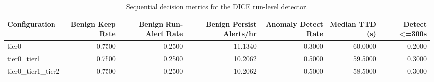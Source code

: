 \begin{table}[t]
\centering
\caption{Sequential decision metrics for the DICE run-level detector.}
\label{tab:dice_sequential_metrics}
\footnotesize
\begin{tabular}{lrrrrrr}
\toprule
Configuration & Benign Keep Rate & Benign Run-Alert Rate & Benign Persist Alerts/hr & Anomaly Detect Rate & Median TTD (s) & Detect <=300s \\
\midrule
tier0 & 0.7500 & 0.2500 & 11.1340 & 0.3000 & 60.0000 & 0.2000 \\
tier0_tier1 & 0.7500 & 0.2500 & 10.2062 & 0.5000 & 59.5000 & 0.3000 \\
tier0_tier1_tier2 & 0.7500 & 0.2500 & 10.2062 & 0.5000 & 58.5000 & 0.3000 \\
\bottomrule
\end{tabular}

\end{table}
